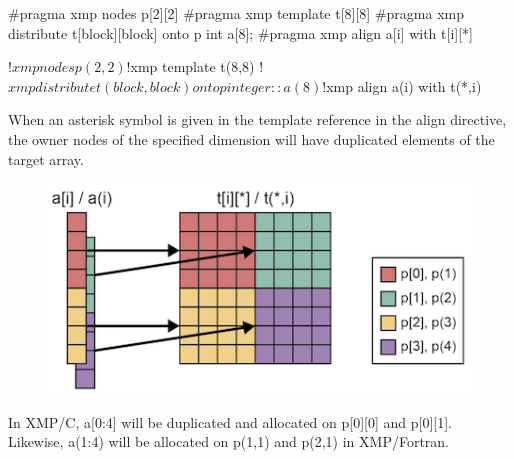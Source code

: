 \begin{XCexample}
#pragma xmp nodes p[2][2]
#pragma xmp template t[8][8]
#pragma xmp distribute t[block][block] onto p
int a[8];
#pragma xmp align a[i] with t[i][*]
\end{XCexample}

\begin{XFexample}
!$xmp nodes p(2,2)
!$xmp template t(8,8)
!$xmp distribute t(block,block) onto p
integer :: a(8)
!$xmp align a(i) with t(*,i)
\end{XFexample}

When an asterisk symbol is given in the template reference in the align
directive, the owner nodes of the specified dimension will have
duplicated elements of the target array.

\begin{figure}
  \centering
  \includegraphics{figs/replicate.png}
\end{figure}

In XMP/C, a[0:4] will be duplicated and allocated on p[0][0] and
  p[0][1]. Likewise, a(1:4) will be allocated on p(1,1) and p(2,1) in
  XMP/Fortran.








